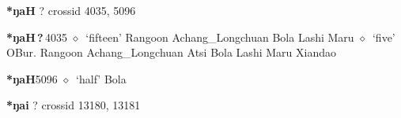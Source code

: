 \item
\textbf{*ŋaH}
?
  {\tiny crossid 4035, 5096}
  \begin{list}{}{\leftmargin=1.5em \itemindent=-1.5em}
  \item {\footnotesize \textbf{*ŋaH\,?\,}}{\tiny 4035}
         $\diamond$~`fifteen'
         Rangoon 
\hspace{1ex}
         Achang\_Longchuan 
\hspace{1ex}
         Bola 
\hspace{1ex}
         Lashi 
\hspace{1ex}
         Maru 
\hspace{1ex}
         $\diamond$~`five'
         OBur. 
\hspace{1ex}
         Rangoon 
\hspace{1ex}
         Achang\_Longchuan 
\hspace{1ex}
         Atsi 
\hspace{1ex}
         Bola 
\hspace{1ex}
         Lashi 
\hspace{1ex}
         Maru 
\hspace{1ex}
         Xiandao 
  \item {\footnotesize \textbf{*ŋaH}}{\tiny 5096}
\hspace{1ex}
         $\diamond$~`half'
         Bola 
  \end{list}
\item
\textbf{*ŋai}
?
  {\tiny crossid 13180, 13181}
